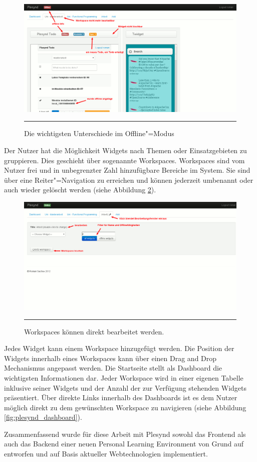 \begin{figure}
  \centering
  \includegraphics[]{./Figures/plesynd_workspace_offline.png}
    \rule{35em}{0.5pt}
  \caption[Plesynd User"=Interface: Workspace Offline]{Die wichtigsten Unterschiede im Offline"=Modus}
  \label{fig:plesynd_workspace_offline}
\end{figure}
Der Nutzer hat die Möglichkeit Widgets nach Themen oder Einsatzgebieten zu gruppieren. Dies geschieht über sogenannte Workspaces. Workspaces sind vom Nutzer frei und in unbegrenzter Zahl hinzufügbare Bereiche im System. Sie sind über eine Reiter"=Navigation zu erreichen und können jederzeit umbenannt oder auch wieder gelöscht werden (siehe Abbildung \ref{fig:plesynd_workspace_edit}). 
\begin{figure}
  \centering
  \includegraphics[]{./Figures/plesynd_workspace_edit.png}
    \rule{35em}{0.5pt}
  \caption[Plesynd User"=Interface: Bearbeiten von Workspaces]{Workspaces können direkt bearbeitet werden.}
  \label{fig:plesynd_workspace_edit}
\end{figure}
Jedes Widget kann einem Workspace hinzugefügt werden. Die Position der Widgets innerhalb eines Workspaces kann über einen Drag and Drop Mechanismus angepasst werden. Die Startseite stellt als Dashboard die wichtigsten Informationen dar. Jeder Workspace wird in einer eigenen Tabelle inklusive seiner Widgets und der Anzahl der zur Verfügung stehenden Widgets präsentiert. Über direkte Links innerhalb des Dashboards ist es dem Nutzer möglich direkt zu dem gewünschten Workspace zu navigieren (siehe Abbildung \ref{fig:plesynd_dashboard}).

Zusammenfassend wurde für diese Arbeit mit Plesynd sowohl das Frontend als auch das Backend einer neuen Personal Learning Environment von Grund auf entworfen und auf Basis aktueller Webtechnologien implementiert.
